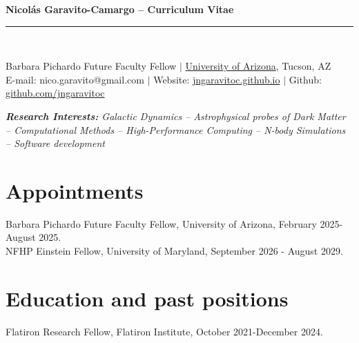 \documentclass[14pt]{article}
\begin{document}
\begin{center}
\indent \textbf{\LARGE Nicol\'as Garavito-Camargo -- Curriculum Vitae} \\
\indent \rule{17cm}{0.4pt}\\
\end{center}

\fontsize{11}{11}\selectfont

\begin{center}
  Barbara Pichardo Future Faculty Fellow $|$
  \href{https://astro.arizona.edu/}
  {University of Arizona}, Tucson, AZ\\
E-mail: nico.garavito@gmail.com $|$ Website: \href{http://jngaravitoc.github.io/Garavito-Camargo}{jngaravitoc.github.io} $|$ Github: \href{http://www.github.com/jngaravitoc}{github.com/jngaravitoc}\\
\end{center}

\begin{center}
\textit{\textbf{Research Interests:} Galactic Dynamics -- Astrophysical probes
  of Dark Matter -- Computational Methods -- High-Performance Computing --
N-body Simulations -- Software development}\\
\end{center}




\section*{Appointments}

\indent Barbara Pichardo Future Faculty Fellow, University of Arizona, February
2025-August 2025. \\

\noindent NFHP Einstein Fellow, University of Maryland, September 2026 - August 2029. 


\section*{Education and past positions}


\indent Flatiron Research Fellow, Flatiron Institute, October 2021-December 2024.\\
\end{document}
